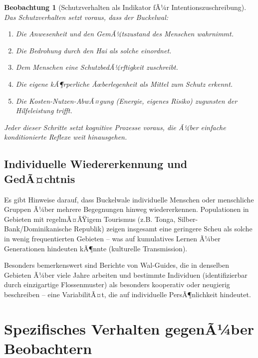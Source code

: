 ﻿\documentclass[12pt,a4paper]{article}
\newtheorem{beobachtung}{Beobachtung}[section]
\theoremstyle{definition}
\theoremstyle{remark}
\begin{document}
\begin{beobachtung}[Schutzverhalten als Indikator fÃ¼r Intentionszuschreibung]
  Das Schutzverhalten setzt voraus, dass der Buckelwal:
  \begin{enumerate}
    \item Die Anwesenheit und den GemÃ¼tszustand des Menschen wahrnimmt.
    \item Die Bedrohung durch den Hai als solche einordnet.
    \item Dem Menschen eine SchutzbedÃ¼rftigkeit zuschreibt.
    \item Die eigene kÃ¶rperliche Ãœberlegenheit als Mittel zum Schutz erkennt.
    \item Die Kosten-Nutzen-AbwÃ¤gung (Energie, eigenes Risiko) zugunsten
          der Hilfeleistung trifft.
  \end{enumerate}
  Jeder dieser Schritte setzt kognitive Prozesse voraus, die Ã¼ber einfache
  konditionierte Reflexe weit hinausgehen.
\end{beobachtung}

\subsection{Individuelle Wiedererkennung und GedÃ¤chtnis}

Es gibt Hinweise darauf, dass Buckelwale individuelle Menschen oder menschliche
Gruppen Ã¼ber mehrere Begegnungen hinweg wiedererkennen. Populationen in
Gebieten mit regelmÃ¤ÃŸigem Tourismus (z.B. Tonga, Silber-Bank/Dominikanische
Republik) zeigen insgesamt eine geringere Scheu als solche in wenig frequentierten
Gebieten -- was auf kumulatives Lernen Ã¼ber Generationen hindeuten kÃ¶nnte
(kulturelle Transmission).

Besonders bemerkenswert sind Berichte von Wal-Guides, die in denselben
Gebieten Ã¼ber viele Jahre arbeiten und bestimmte Individuen (identifizierbar
durch einzigartige Flossenmuster) als besonders kooperativ oder neugierig
beschreiben -- eine VariabilitÃ¤t, die auf individuelle PersÃ¶nlichkeit hindeutet.

\section{Spezifisches Verhalten gegenÃ¼ber Beobachtern}
\label{sec:kamera}
\end{document}
